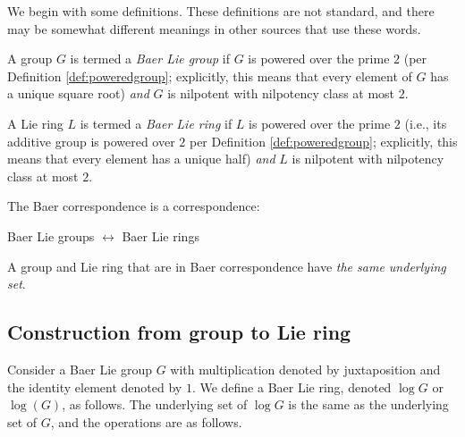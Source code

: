 \documentclass{ucetd}
\begin{document}
We begin with some definitions. These definitions are not standard,
and there may be somewhat different meanings in other sources that use
these words.

\begin{definer}\label{def:baer-lie-group}
  A group $G$ is termed a {\em Baer Lie group} if $G$ is powered over
  the prime $2$ (per Definition \ref{def:poweredgroup}; explicitly,
  this means that every element of $G$ has a unique square root) {\em
    and} $G$ is nilpotent with nilpotency class at most $2$.
\end{definer}

\begin{definer}\label{def:baer-lie-ring}
  A Lie ring $L$ is termed a {\em Baer Lie ring} if $L$ is powered
  over the prime $2$ (i.e., its additive group is powered over $2$ per
  Definition \ref{def:poweredgroup}; explicitly, this means that every
  element has a unique half) {\em and} $L$ is nilpotent with
  nilpotency class at most $2$.
\end{definer}

The Baer correspondence is a correspondence:

\begin{center}
  Baer Lie groups $\leftrightarrow$ Baer Lie rings
\end{center}

A group and Lie ring that are in Baer correspondence have {\em the
  same underlying set}.

\subsection{Construction from group to Lie ring}\label{sec:baer-group-to-lie-ring}

Consider a Baer Lie group $G$ with multiplication denoted by
juxtaposition and the identity element denoted by $1$. We define a
Baer Lie ring, denoted $\log G$ or $\log(G)$, as follows. The
underlying set of $\log G$ is the same as the underlying set of $G$,
and the operations are as follows.
\end{document}
